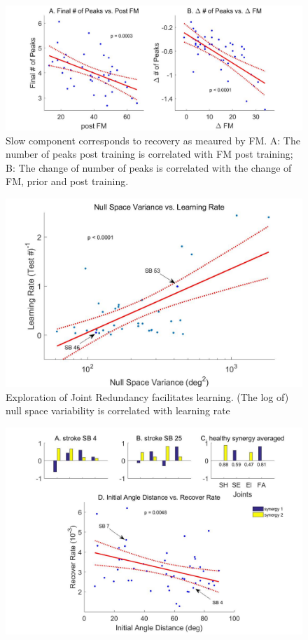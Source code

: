 \begin{figure}
	\centering
	\includegraphics[width=1\linewidth]{figures/4slowComponentIsRecovery}
	\caption[Slow component corresponds to recovery as meaured by FM]
	{Slow component corresponds to recovery as meaured by FM. 
		A: The number of peaks post training is correlated with FM post training;
		B: The change of number of peaks is correlated with the change of FM, prior and post training.}
	\label{fig:4slowcomponentisrecovery}
\end{figure}

\begin{figure}
	\centering
	\includegraphics[width=1\linewidth]{figures/5learnRateVSnullVar}
	\caption[Exploration of Joint Redundancy facilitates learning]
	{Exploration of Joint Redundancy facilitates learning. (The log of) null space variability is correlated with learning rate}
	\label{fig:5learnratevsnullvar}
\end{figure}

\begin{figure}
	\centering
	\includegraphics[width=1\linewidth]{figures/6synergy}
	\caption[Abnormal Synergies]{}
	\label{fig:6synergy}
\end{figure}

